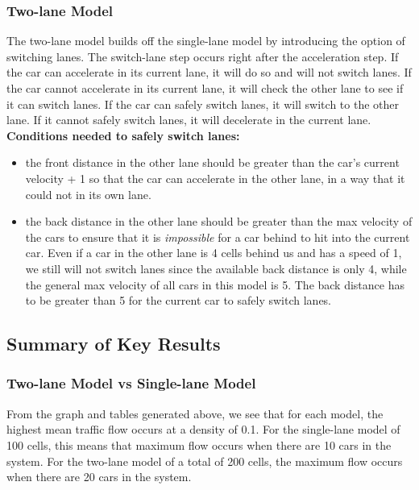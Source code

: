 \documentclass[11pt]{article}
\begin{document}
\subsubsection{Two-lane Model}

The two-lane model builds off the single-lane model by introducing the
option of switching lanes. The switch-lane step occurs right after the
acceleration step. If the car can accelerate in its current lane, it
will do so and will not switch lanes. If the car cannot accelerate in
its current lane, it will check the other lane to see if it can switch
lanes. If the car can safely switch lanes, it will switch to the other
lane. If it cannot safely switch lanes, it will decelerate in the
current lane.\\

\textbf{Conditions needed to safely switch lanes:}

\begin{itemize}
\item
  the front distance in the other lane should be greater than the car's
  current velocity + 1 so that the car can accelerate in the other lane,
  in a way that it could not in its own lane.
\item
  the back distance in the other lane should be greater than the max
  velocity of the cars to ensure that it is \emph{impossible} for a car
  behind to hit into the current car. Even if a car in the other lane is
  4 cells behind us and has a speed of 1, we still will not switch lanes
  since the available back distance is only 4, while the general max
  velocity of all cars in this model is 5. The back distance has to be
  greater than 5 for the current car to safely switch lanes.
\end{itemize}

    \subsection{Summary of Key Results}

\subsubsection{Two-lane Model vs Single-lane Model}

From the graph and tables generated above, we see that for each model,
the highest mean traffic flow occurs at a density of 0.1. For the
single-lane model of 100 cells, this means that maximum flow occurs when
there are 10 cars in the system. For the two-lane model of a total of
200 cells, the maximum flow occurs when there are 20 cars in the system.\\
\end{document}
